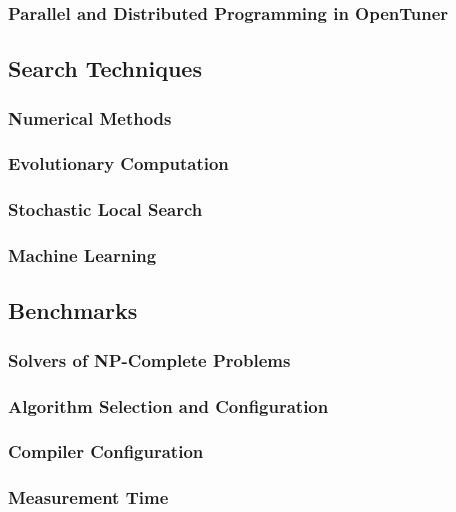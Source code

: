 \subsubsection{Parallel and Distributed Programming in OpenTuner}
\label{sec:opentuner-parallel}

\subsection{Search Techniques}
\label{sec:techniques}

\subsubsection{Numerical Methods}
\label{subsec:num}

\subsubsection{Evolutionary Computation}
\label{subsec:tuninevolcomp}

\subsubsection{Stochastic Local Search}
\label{subsec:tuningsls}

\subsubsection{Machine Learning}
\label{subsec:tuningml}

\subsection{Benchmarks}
\label{sec:benchmarks}

\subsubsection{Solvers of NP-Complete Problems}
\label{subsec:np}

\subsubsection{Algorithm Selection and Configuration}
\label{subsec:algsel}

\subsubsection{Compiler Configuration}
\label{subsec:compilerconfig}

\subsubsection{Measurement Time}
\label{subsec:measure}
